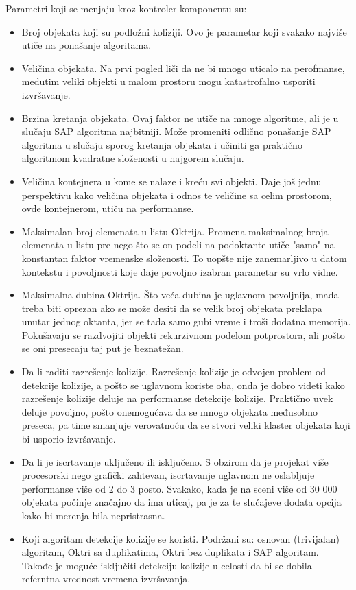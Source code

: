 \documentclass[12pt,oneside]{memoir}
\begin{document}
Parametri koji se menjaju kroz kontroler komponentu su: 
\begin{itemize}  
	\item Broj objekata koji su podložni koliziji. 
	Ovo je parametar koji svakako najviše utiče na ponašanje algoritama.
	\item Veličina objekata. 
	Na prvi pogled liči da ne bi mnogo uticalo na perofmanse, međutim veliki objekti u malom prostoru mogu katastrofalno usporiti izvršavanje.
	\item Brzina kretanja objekata.
	Ovaj faktor ne utiče na mnoge algoritme, ali je u slučaju SAP algoritma najbitniji. Može promeniti odlično ponašanje SAP algoritma u slučaju sporog kretanja 
	objekata i učiniti ga praktično algoritmom kvadratne složenosti u najgorem slučaju.
	\item Veličina kontejnera u kome se nalaze i kreću svi objekti.
	Daje još jednu perspektivu kako veličina objekata i odnos te veličine sa celim prostorom, ovde kontejnerom, utiču na performanse.
	\item Maksimalan broj elemenata u listu Oktrija.
	Promena maksimalnog broja elemenata u listu pre nego što se on podeli na podoktante utiče "samo" na konstantan faktor vremenske složenosti.
	To uopšte nije zanemarljivo u datom kontekstu i povoljnosti koje daje povoljno izabran parametar su vrlo vidne.
	\item Maksimalna dubina Oktrija. Što veća dubina je uglavnom povoljnija, mada treba biti oprezan ako se može desiti 
	da se velik broj objekata preklapa unutar jednog oktanta, jer se tada samo gubi vreme i troši dodatna memorija. 
	Pokušavaju se razdvojiti objekti rekurzivnom podelom potprostora, ali pošto se oni presecaju taj put je beznatežan.
	\item Da li raditi razrešenje kolizije. 
	Razrešenje kolizije je odvojen problem od detekcije kolizije, a pošto se uglavnom koriste oba, onda je dobro videti 
	kako razrešenje kolizije deluje na performanse detekcije kolizije. Praktično uvek deluje povoljno, pošto onemogućava da se mnogo 
	objekata međusobno preseca, pa time smanjuje verovatnoću da se stvori veliki klaster objekata koji bi usporio izvršavanje.
	\item Da li je iscrtavanje uključeno ili isključeno. 
	S obzirom da je projekat više procesorski nego grafički zahtevan, iscrtavanje uglavnom ne oslabljuje performanse više od 2 do 3 posto.
	Svakako, kada je na sceni više od 30 000 objekata počinje značajno da ima uticaj, pa je za te slučajeve dodata opcija kako bi merenja bila nepristrasna.
	\item Koji algoritam detekcije kolizije se koristi. Podržani su: osnovan (trivijalan) algoritam, Oktri sa duplikatima,
	Oktri bez duplikata i SAP algoritam. Takođe je moguće isključiti detekciju kolizije u celosti da bi se dobila referntna vrednost vremena izvršavanja.

\end{itemize}  
\end{document}
